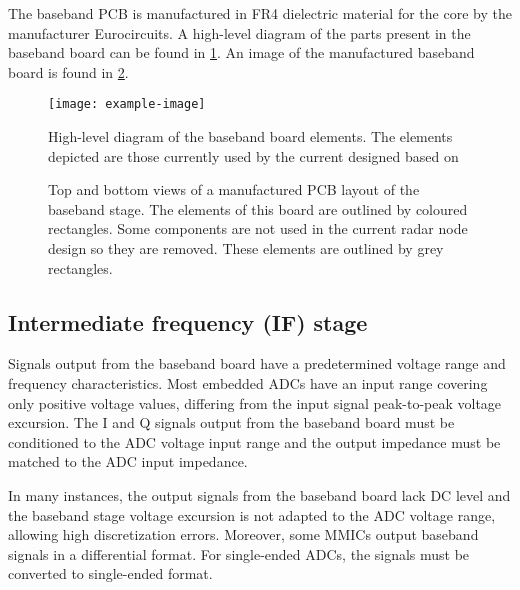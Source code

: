 The baseband PCB is manufactured in FR4 dielectric material for the core by the manufacturer Eurocircuits. A high-level diagram of the parts present in the baseband board can be found in \cref{fig:baseband_board_general_diagram}. An image of the manufactured baseband board is found in \cref{fig:baseband_board_general}.

\begin{figure}[ht]
	\centering
	\texttt{[image: example-image]}
	\caption{High-level diagram of the baseband board elements. The elements depicted are those currently used by the current designed based on \cite{Sardinero2022} \label{fig:baseband_board_general_diagram}}
\end{figure}

\begin{figure}[ht]
	\centering
	\caption{Top and bottom views of a manufactured PCB layout of the baseband stage. The elements of this board are outlined by coloured rectangles. Some components are not used in the current radar node design so they are removed. These elements are outlined by grey rectangles. \label{fig:baseband_board_general}}
\end{figure}

\subsection{Intermediate frequency (IF) stage}

Signals output from the baseband board have a predetermined voltage range and frequency characteristics. Most embedded ADCs have an input range covering only positive voltage values, differing from the input signal peak-to-peak voltage excursion. The I and Q signals output from the baseband board must be conditioned to the ADC voltage input range and the output impedance must be matched to the ADC input impedance.

In many instances, the output signals from the baseband board lack DC level and the baseband stage voltage excursion is not adapted to the ADC voltage range, allowing high discretization errors. Moreover, some MMICs \cite{Antolinos2020} output baseband signals in a differential format. For single-ended ADCs, the signals must be converted to single-ended format.


